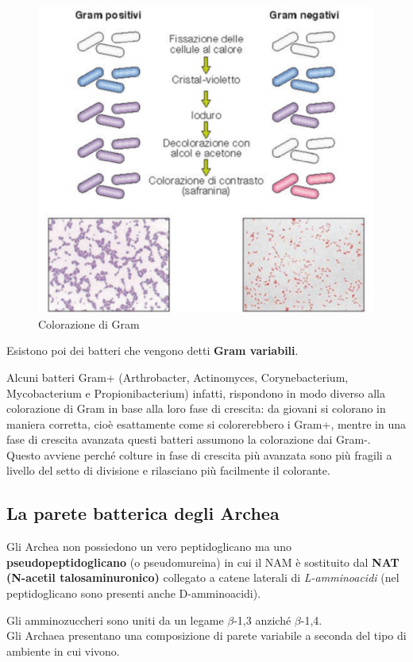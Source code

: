 \documentclass[11pt]{book}
\begin{document}
\begin{figure}[htp]
\centering
\includegraphics[scale=0.5]{img/Colorazione di Gram.png}
\caption{Colorazione di Gram}
\label{}
\end{figure}

Esistono poi dei batteri che vengono detti \textbf{Gram variabili}.

Alcuni batteri Gram+ (Arthrobacter, Actinomyces, Corynebacterium, Mycobacterium e Propionibacterium) infatti, rispondono in modo diverso alla colorazione di Gram in base alla loro fase di crescita: da giovani si colorano in maniera corretta, cioè esattamente come si colorerebbero i Gram+, mentre in una fase di crescita avanzata questi batteri assumono la colorazione dai Gram-. Questo avviene perché colture in fase di crescita più avanzata sono più fragili a livello del setto di divisione e rilasciano più facilmente il colorante.


\subsection{La parete batterica degli Archea}
Gli Archea non possiedono un vero peptidoglicano ma uno \textbf{pseudopeptidoglicano} (o pseudomureina) in cui il NAM è sostituito dal \textbf{NAT (N-acetil talosaminuronico)} collegato a catene laterali di \emph{L-amminoacidi} (nel peptidoglicano sono presenti anche D-amminoacidi).

Gli amminozuccheri sono uniti da un legame $\beta$-1,3 anziché $\beta$-1,4.\\
Gli Archaea presentano una composizione di parete variabile a seconda del tipo di ambiente in cui vivono.
\end{document}
